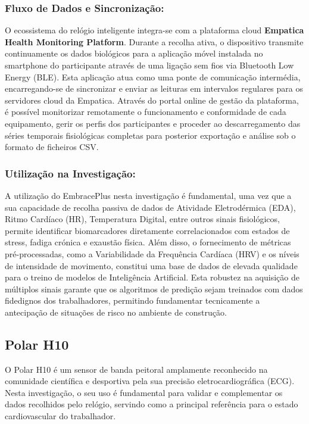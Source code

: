 \subsubsection*{Fluxo de Dados e Sincronização:}

O ecossistema do relógio inteligente integra-se com a plataforma cloud \textbf{Empatica Health Monitoring Platform}. Durante a recolha ativa, o dispositivo transmite continuamente os dados biológicos para a aplicação móvel instalada no smartphone do participante através de uma ligação sem fios via Bluetooth Low Energy (BLE). Esta aplicação atua como uma ponte de comunicação intermédia, encarregando-se de sincronizar e enviar as leituras em intervalos regulares para os servidores cloud da Empatica. Através do portal online de gestão da plataforma, é possível monitorizar remotamente o funcionamento e conformidade de cada equipamento, gerir os perfis dos participantes e proceder ao descarregamento das séries temporais fisiológicas completas para posterior exportação e análise sob o formato de ficheiros CSV.

\subsubsection*{Utilização na Investigação:}

A utilização do EmbracePlus nesta investigação é fundamental, uma vez que a sua capacidade de recolha passiva de dados de Atividade Eletrodérmica (EDA), Ritmo Cardíaco (HR), Temperatura Digital, entre outros sinais fisiológicos, permite identificar biomarcadores diretamente correlacionados com estados de stress, fadiga crónica e exaustão física. Além disso, o fornecimento de métricas pré-processadas, como a Variabilidade da Frequência Cardíaca (HRV) e os níveis de intensidade de movimento, constitui uma base de dados de elevada qualidade para o treino de modelos de Inteligência Artificial. Esta robustez na aquisição de múltiplos sinais garante que os algoritmos de predição sejam treinados com dados fidedignos dos trabalhadores, permitindo fundamentar tecnicamente a antecipação de situações de risco no ambiente de construção.

\subsection{Polar H10}

O Polar H10 é um sensor de banda peitoral amplamente reconhecido na comunidade científica e desportiva pela sua precisão eletrocardiográfica (ECG). Nesta investigação, o seu uso é fundamental para validar e complementar os dados recolhidos pelo relógio, servindo como a principal referência para o estado cardiovascular do trabalhador.

